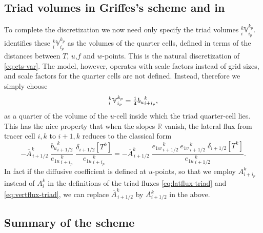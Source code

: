 \documentclass[../main/NEMO_manual]{subfiles}
\begin{document}
\subsection{Triad volumes in Griffes's scheme and in \NEMO}

To complete the discretization we now need only specify the triad volumes $_i^k\mathbb{V}_{i_p}^{k_p}$.
\citet{Griffies_al_JPO98} identifies these $_i^k\mathbb{V}_{i_p}^{k_p}$ as the volumes of the quarter cells,
defined in terms of the distances between $T$, $u$,$f$ and $w$-points.
This is the natural discretization of \autoref{eq:cts-var}.
The \NEMO model, however, operates with scale factors instead of grid sizes,
and scale factors for the quarter cells are not defined.
Instead, therefore we simply choose
\begin{equation}
  \label{eq:V-NEMO}
  _i^k\mathbb{V}_{i_p}^{k_p}=\textstyle \frac{1}{4} {b_u}_{i+i_p}^k,
\end{equation}
as a quarter of the volume of the $u$-cell inside which the triad quarter-cell lies.
This has the nice property that when the slopes $\mathbb{R}$ vanish,
the lateral flux from tracer cell $i,k$ to $i+1,k$ reduces to the classical form
\begin{equation}
  \label{eq:lat-normal}
  -\overline{A}_{\,i+1/2}^k\;
  \frac{{b_u}_{i+1/2}^k}{{e_{1u}}_{\,i + i_p}^{\,k}}
  \;\frac{\delta_{i+ 1/2}[T^k] }{{e_{1u}}_{\,i + i_p}^{\,k}}
  = -\overline{A}_{\,i+1/2}^k\;\frac{{e_{1w}}_{\,i + 1/2}^{\,k}\:{e_{1v}}_{\,i + 1/2}^{\,k}\;\delta_{i+ 1/2}[T^k]}{{e_{1u}}_{\,i + 1/2}^{\,k}}.
\end{equation}
In fact if the diffusive coefficient is defined at $u$-points,
so that we employ ${A}_{i+i_p}^k$ instead of  ${A}_i^k$ in the definitions of the triad fluxes
\autoref{eq:latflux-triad} and \autoref{eq:vertflux-triad},
we can replace $\overline{A}_{\,i+1/2}^k$ by $A_{i+1/2}^k$ in the above.

\subsection{Summary of the scheme}
\end{document}
